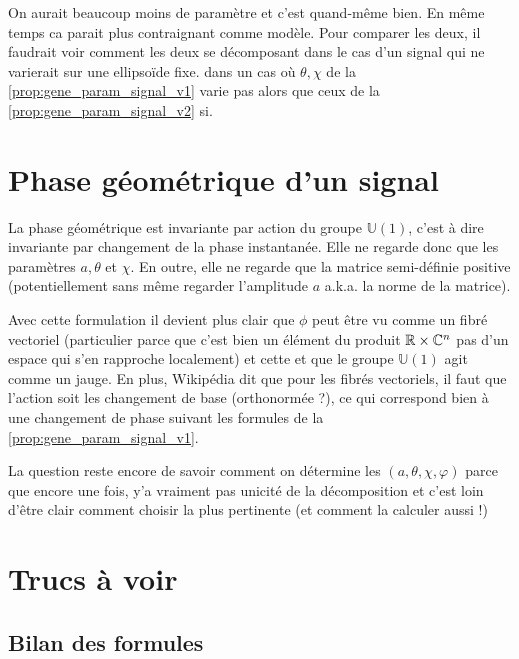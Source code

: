 On aurait beaucoup moins de paramètre et c'est quand-même bien. En même temps ca parait plus contraignant comme modèle. Pour comparer les deux, il faudrait voir comment les deux se décomposant dans le cas d'un signal qui ne varierait sur une ellipsoïde fixe. \ie dans un cas où $\theta,\chi$ de la \cref{prop:gene_param_signal_v1} varie pas alors que ceux de la \cref{prop:gene_param_signal_v2} si.




\setcounter{figure}{0}
\setcounter{lstlisting}{0}

\section{Phase géométrique d'un signal}\label{sec:phasegeo}

La phase géométrique est invariante par action du groupe $\mathbb{U}(1)$, c'est à dire invariante par changement de la phase instantanée. Elle ne regarde donc que les paramètres $a, \theta$ et $\chi$. En outre, elle ne regarde que la matrice semi-définie positive (potentiellement sans même regarder l'amplitude $a$ a.k.a. la norme de la matrice).

Avec cette formulation il devient plus clair que $\phi$ peut être vu comme un fibré vectoriel (particulier parce que c'est bien un élément du produit $\mathbb{R}\times\mathbb{C}^n$ pas d'un espace qui s'en rapproche localement) et cette et que le groupe $\mathbb{U}(1)$ agit comme un jauge. En plus, Wikipédia dit que pour les fibrés vectoriels, il faut que l'action soit les changement de base (orthonormée ?), ce qui correspond bien à une changement de phase suivant les formules de la \cref{prop:gene_param_signal_v1}.

La question reste encore de savoir comment on détermine les $(a,\theta,\chi,\varphi)$ parce que encore une fois, y'a vraiment pas unicité de la décomposition et c'est loin d'être clair comment choisir la plus pertinente (et comment la calculer aussi !)



\section{Trucs à voir}

\subsection{Bilan des formules}

